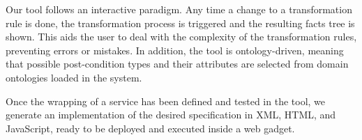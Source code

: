Our tool follows an interactive paradigm. Any time a change to a transformation rule is done, the transformation process is triggered and the resulting facts tree is shown. This aids the user to deal with the complexity of the transformation rules, preventing errors or mistakes. In addition, the tool is ontology-driven, meaning that possible post-condition types and their attributes are selected from domain ontologies loaded in the system.




Once the wrapping of a service has been defined and tested in the tool, we generate an implementation of the desired specification in XML, HTML, and JavaScript, ready to be deployed and executed inside a web gadget. 



